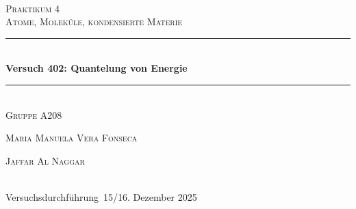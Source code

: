 

\setlength\headheight{24pt}
\setlength\footheight{15pt}
\chead{}						%
\ohead{\textbf{\headmark}}		%
\cfoot*{\pagemark}				%
\renewcommand*\chapterheadstartvskip{\vspace*{-1cm}}




\begin{titlepage}
\newcommand{\HRule}{\rule{\linewidth}{0.5mm}}
\center
\textsc{\LARGE }\\[1.5cm] %
\textsc{\LARGE Praktikum 4}\\[0.5cm] %
\textsc{\large Atome, Moleküle, kondensierte Materie}\\[0.5cm] %

\HRule \\[0.4cm]
{ \huge \bfseries Versuch 402: Quantelung von Energie }\\[0.4cm] %
\HRule \\[0.2cm]
\Large{\textsc{Gruppe A208}}\\[0.2cm]
 
\begin{minipage}{0.4\textwidth}
\vspace{0.7em}
\begin{flushleft} \large
\textsc{Maria Manuela Vera Fonseca} %
\end{flushleft}
\end{minipage}
\begin{minipage}{0.4\textwidth}
\begin{flushright} \large
\textsc{Jaffar Al Naggar}
\end{flushright}
\end{minipage}\\[2.0cm]

{\large Versuchsdurchführung\, 15/16. Dezember 2025 }\\[8cm] %


\end{titlepage}
